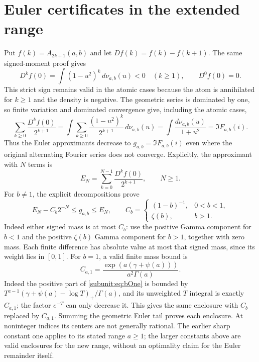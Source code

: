 \section{Euler certificates in the extended range}

Put $f(k)=A_{2k+1}(a,b)$ and let $D f(k)=f(k)-f(k+1)$.
The same signed-moment proof gives
\[
 D^k f(0)=\int(1-u^2)^k\,d\nu_{a,b}(u)<0\quad(k\geq1),
 \qquad D^0f(0)=0.
\]
This strict sign remains valid in the atomic cases because the atom
is annihilated for $k\geq1$ and the density is negative.
The geometric series is dominated by one, so finite variation and
dominated convergence give, including the atomic cases,
\[
 \sum_{k\geq0}\frac{D^kf(0)}{2^{k+1}}
 =\int\sum_{k\geq0}\frac{(1-u^2)^k}{2^{k+1}}\,d\nu_{a,b}(u)
 =\int\frac{d\nu_{a,b}(u)}{1+u^2}=\Im F_{a,b}(i).
\]
Thus the Euler approximants decrease to $g_{a,b}=\Im F_{a,b}(i)$
even where the original alternating Fourier series does not converge.
Explicitly, the approximant with $N$ terms is
\[
 E_N=\sum_{k=0}^{N-1}\frac{D^kf(0)}{2^{k+1}},\qquad N\ge1.
\]
For $b\ne1$, the explicit decompositions prove
\[
 E_N-C_b2^{-N}\leq g_{a,b}\leq E_N,\qquad
 C_b=\begin{cases}(1-b)^{-1},&0<b<1,\\\zeta(b),&b>1.\end{cases}
\]
Indeed either signed mass is at most $C_b$: use the positive Gamma
component for $b<1$ and the positive $\zeta(b)$ Gamma component for
$b>1$, together with zero mass. Each finite difference has absolute
value at most that signed mass, since its weight lies in $[0,1]$.
For $b=1$, a valid finite mass bound is
\[
 C_{a,1}=\frac{\exp(a(\gamma+\psi(a)))}{a^2\Gamma(a)}.
\]
Indeed the positive part of \eqref{subunit:eq:bOne} is bounded by
$T^{a-1}(\gamma+\psi(a)-\log T)_+/\Gamma(a)$, and its unweighted
$T$ integral is exactly $C_{a,1}$; the factor $e^{-T}$ can only
decrease it. This gives the same enclosure with $C_b$ replaced by
$C_{a,1}$. Summing the geometric Euler tail proves each enclosure.
At noninteger indices its centers are not generally rational. The
earlier sharp constant one applies to its stated range $a\geq1$;
the larger constants above are valid enclosures for the new range,
without an optimality claim for the Euler remainder itself.

